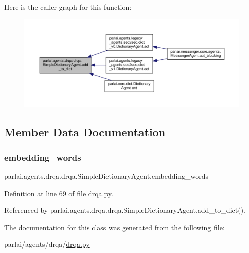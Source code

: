 Here is the caller graph for this function\+:
\nopagebreak
\begin{figure}[H]
\begin{center}
\leavevmode
\includegraphics[width=350pt]{classparlai_1_1agents_1_1drqa_1_1drqa_1_1SimpleDictionaryAgent_a5ccaf2bd28a50af2062ad2efd6a36e0e_icgraph}
\end{center}
\end{figure}


\subsection{Member Data Documentation}
\mbox{\label{classparlai_1_1agents_1_1drqa_1_1drqa_1_1SimpleDictionaryAgent_a26ce0c0cc3362b43219d488826c3550a}} 
\subsubsection{\texorpdfstring{embedding\+\_\+words}{embedding\_words}}
{\footnotesize\ttfamily parlai.\+agents.\+drqa.\+drqa.\+Simple\+Dictionary\+Agent.\+embedding\+\_\+words}



Definition at line 69 of file drqa.\+py.



Referenced by parlai.\+agents.\+drqa.\+drqa.\+Simple\+Dictionary\+Agent.\+add\+\_\+to\+\_\+dict().



The documentation for this class was generated from the following file\+:\begin{DoxyCompactItemize}
\item 
parlai/agents/drqa/\hyperlink{drqa_8py}{drqa.\+py}\end{DoxyCompactItemize}
